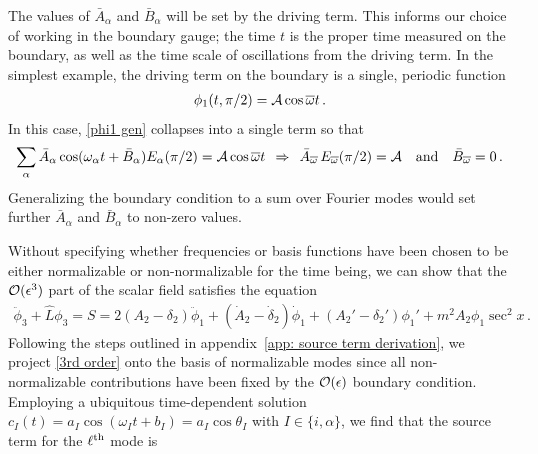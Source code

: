 \documentclass[../PhD.tex]{subfiles}
\newcommand{\ob}{\overline{\omega}}
\begin{document}
The values of $\bar A_\alpha$ and $\bar{B}_\alpha$ will be set by the driving term. This informs our choice of working in the boundary gauge; the time $t$ is the proper time measured on the boundary, as well as the time scale of oscillations from the driving term. In the simplest example, the driving term on the boundary is a single, periodic function
\begin{align}
\label{BC}
\phi_1(t,\pi/2) = \mc A \cos \ob t \, .
\end{align}
In this case, \eqref{phi1 gen} collapses into a single term so that
\begin{align}
\sum_\alpha \bar A_\alpha \cos (\omega_\alpha t + \bar B_\alpha )  E_{\alpha} (\pi / 2) = \mc A \cos \ob t \:\: \Rightarrow \:\: \bar A_{\ob} \, E_{\ob} (\pi / 2) = \mc A \quad \text{and} \quad \bar B_{\ob} = 0 \, .
\end{align}
Generalizing the boundary condition to a sum over Fourier modes would set further $\bar A_\alpha$ and $\bar B_\alpha$ to non-zero values. 

Without specifying whether frequencies or basis functions have been chosen to be either normalizable or non-normalizable for the time being, we can show that the $\mathcal O(\epsilon^3)$ part of the scalar field satisfies the equation
\begin{align}
\label{3rd order}
\ddot \phi_3 + \hat L \phi_3 = S = 2 (A_2 - \delta_2) \ddot \phi_1 + (\dot A_2 - \dot \delta_2) \dot\phi_1 + (A_2' -\delta_2' )\phi_1' + m^2 A_2 \phi_1 \sec^2 x \, .
\end{align}
Following the steps outlined in appendix~\ref{app: source term derivation}, we project \eqref{3rd order} onto the basis of normalizable modes since all non-normalizable contributions have been fixed by the $\mathcal O(\epsilon)$ boundary condition. Employing a ubiquitous time-dependent solution ${c_I(t) = a_I \cos (\omega_I t + b_I) = a_I \cos\theta_I}$ with $I \in \{i, \alpha \}$, we find that the source term for the $\ell^{\rm th}$ mode is
\end{document}
